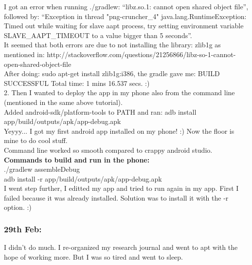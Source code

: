 \documentclass[11pt]{article}
\begin{document}
I got an error when running ./gradlew: ``libz.so.1: cannot open shared object file'', followed by: ``Exception in thread "png-cruncher\_4" 
java.lang.RuntimeException: Timed out while waiting for slave aapt process, try setting environment variable SLAVE\_AAPT\_TIMEOUT to a value bigger 
than 5 seconds''.\\
It seemed that both errors are due to not installing the library: zlib1g as mentioned in: 
http://stackoverflow.com/questions/21256866/libz-so-1-cannot-open-shared-object-file\\
After doing: sudo apt-get install zlib1g:i386, the gradle gave me: BUILD SUCCESSFUL Total time: 1 mins 16.537 secs. :)\\

2. Then I wanted to deploy the app in my phone also from the command line (mentioned in the same above tutorial).\\
Added android-sdk/platform-tools to PATH and ran: adb install app/build/outputs/apk/app-debug.apk\\
Yeyyy... I got my first android app installed on my phone! :) Now the floor is mine to do cool stuff.\\

Command line worked so smooth compared to crappy android studio. \\
\textbf{Commands to build and run in the phone:}\\
./gradlew assembleDebug\\
adb install -r app/build/outputs/apk/app-debug.apk\\

I went step further, I editted my app and tried to run again in my app. First I failed because it was already installed. Solution was to install it 
with the -r option. :)

\subsubsection*{29th Feb:}
I didn't do much. I re-organized my research journal and went to apt with the hope of working more. But I was so tired and went to sleep.
\end{document}
